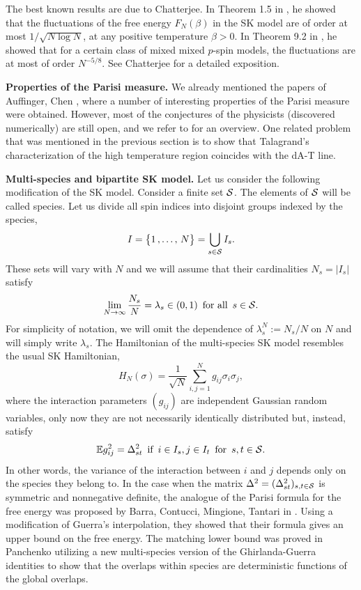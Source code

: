 \documentclass[12pt]{article}
\newcommand{\spe}{{\cal S}}
\newcommand{\e}{\mathbb{E}}
\theoremstyle{nonumberplain}
\begin{document}
The best known results are due to Chatterjee. In Theorem 1.5 in \cite{Chatt09}, he showed that the fluctuations of the free energy $F_{N}(\beta)$ in the SK model are of order at most $1/\sqrt{N\log N}$, at any positive temperature $\beta>0.$ In Theorem 9.2 in \cite{Chatt08}, he showed that for a certain class of mixed mixed $p$-spin models, the fluctuations are at most of order $N^{-5/8}$. See Chatterjee \cite{Chatt14} for a detailed exposition.


\medskip
\noindent
\textbf{Properties of the Parisi measure.} We already mentioned the papers of Auffinger, Chen \cite{AufChen1, AufChen2}, where a number of interesting properties of the Parisi measure were obtained. However, most of the conjectures of the physicists (discovered numerically) are still open, and we refer to \cite{AufChen1} for an overview. One related problem that was mentioned in the previous section is to show that Talagrand's characterization of the high temperature region coincides with the dA-T line.


\medskip
\noindent
\textbf{Multi-species and bipartite SK model.} Let us consider the following modification of the SK model. Consider a finite set $\spe$. The elements of $\spe$ will be called species. Let us divide all spin indices into disjoint groups indexed by the species,
\begin{equation}
I = \bigl\{1\, ,\ldots,\, N\bigr\} = \bigcup_{s\in\spe} I_s.
\label{species}
\end{equation}
These sets will vary with $N$ and we will assume that their cardinalities $N_s =|I_s|$ satisfy 
\begin{equation}
\lim_{N\to\infty} \frac{N_s}{N} = \lambda_s \in (0,1)
\,\mbox{ for all }\, s\in\spe.
\end{equation}
For simplicity of notation, we will omit the dependence of $\lambda_s^N := N_s/N$ on $N$ and will simply write $\lambda_s$. The Hamiltonian of the multi-species SK model resembles the usual SK Hamiltonian,
\begin{equation}
H_N(\sigma) = \frac{1}{\sqrt{N}} \sum_{i,j =1}^N g_{ij}\sigma_i \sigma_j,
\label{SKHms}
\end{equation}
where the interaction parameters $(g_{ij})$ are independent Gaussian random variables, only now they are not necessarily identically distributed but, instead, satisfy
\begin{equation}
\e g_{ij}^2 = \Delta_{st}^2 \,\mbox{ if }\, i\in I_s, j\in I_t \,\mbox{ for }\, s,t\in\spe.
\label{Delta}
\end{equation}
In other words, the variance of the interaction between $i$ and $j$ depends only on the species they belong to. In the case when the matrix $\Delta^2 = (\Delta_{st}^2)_{s,t\in\spe}$ is symmetric and nonnegative definite, the analogue of the Parisi formula for the free energy was proposed by Barra, Contucci, Mingione, Tantari in \cite{MS}. Using a modification of Guerra's interpolation, they showed that their formula gives an upper bound on the free energy. The matching lower bound was proved in Panchenko \cite{multi-species} utilizing a new multi-species version of the Ghirlanda-Guerra identities to show that the overlaps within species are deterministic functions of the global overlaps. 
\end{document}
